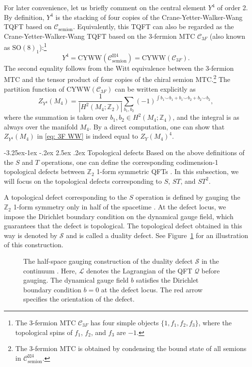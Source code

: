 \documentclass[aps,twocolumn,prx,floatfix,preprintnumbers, nofootinbib,10pt]{revtex4-2}
\makeatletter
\numberwithin{equation}{section}
\theoremstyle{definition}
\theoremstyle{remark}
\theoremstyle{claim}
\renewcommand\subsubsection{\@startsection{subsubsection}{3}{\z@}%
                                     {-3.25ex\@plus -1ex \@minus -.2ex}%
                                     {2.5ex \@plus .2ex}%
                                     {\centering\itshape\bfseries\small}}
\makeatother
\begin{document}
For later convenience, let us briefly comment on the central element $Y^4$ of order 2.
By definition, $Y^4$ is the stacking of four copies of the Crane-Yetter-Walker-Wang TQFT based on $\mathcal{C}_{\mathrm{semion}}$.
Equivalently, this TQFT can also be regarded as the Crane-Yetter-Walker-Wang TQFT based on the 3-fermion MTC $\mathcal{C}_{3F}$ (also known as $\mathrm{SO}(8)_1$):\footnote{The 3-fermion MTC $\mathcal{C}_{3F}$ has four simple objects $\{1, f_1, f_2, f_3\}$, where the topological spins of $f_1$, $f_2$, and $f_3$ are $-1$.}
\begin{equation}
Y^4 = \mathrm{CYWW}(\mathcal{C}_{\mathrm{semion}}^{\boxtimes 4}) = \mathrm{CYWW}(\mathcal{C}_{3F}).
\end{equation}
The second equality follows from the Witt equivalence between the 3-fermion MTC and the tensor product of four copies of the chiral semion MTC.\footnote{The 3-fermion MTC is obtained by condensing the bound state of all semions in $\mathcal{C}_{\mathrm{semion}}^{\boxtimes 4}$.}
The partition function of $\mathrm{CYWW}(\mathcal{C}_{3F})$  can be written explicitly as
\begin{equation}
Z_{Y^4}(M_4) = \frac{1}{|H^2(M_4; \mathbb{Z}_2)|} \sum_{b_1, b_2} (-1)^{\int b_1 \smile b_1 + b_1 \smile b_2 + b_2 \smile b_2},
\label{eq: 3F WW}
\end{equation}
where the summation is taken over $b_1, b_2 \in H^2(M_4; \mathbb{Z}_4)$, and the integral is as always over the manifold $M_4$.
By a direct computation, one can show that $Z_{Y^4}(M_4)$ in \eqref{eq: 3F WW} is indeed equal to $Z_Y(M_4)^4$.



\subsubsection{Topological defects}
Based on the above definitions of the $S$ and $T$ operations, one can define the corresponding codimension-1 topological defects between $\mathbb{Z}_2$ 1-form symmetric QFTs \cite{Choi:2021kmx, Choi:2022zal}.
In this subsection, we will focus on the topological defects corresponding to $S$, $ST$, and $ST^2$.

A topological defect corresponding to the $S$ operation is defined by gauging the $\mathbb{Z}_2$ 1-form symmetry only in half of the spacetime \cite{Choi:2021kmx, Choi:2022zal}.
At the defect locus, we impose the Dirichlet boundary condition on the dynamical gauge field, which guarantees that the defect is topological.
The topological defect obtained in this way is denoted by $\mathcal{S}$ and is called a duality defect.
See Figure~\ref{fig: D defect} for an illustration of this construction.
\begin{figure}
\centering
{}
\caption{The half-space gauging construction of the duality defect $\mathcal{S}$ in the continuum \cite{Choi:2021kmx, Choi:2022zal}. Here, $\mathcal{L}$ denotes the Lagrangian of the QFT $\mathcal{Q}$ before gauging. The dynamical gauge field $b$ satisfies the Dirichlet boundary condition $b=0$ at the defect locus. The red arrow specifies the orientation of the defect.}
\label{fig: D defect}
\end{figure}
\end{document}
